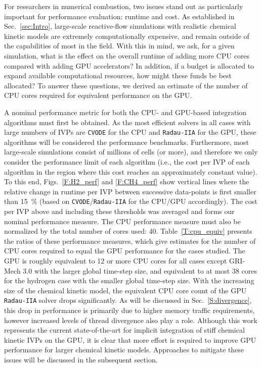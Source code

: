 \documentclass[preprint,review,11pt]{elsarticle}
\begin{document}
For researchers in numerical combustion, two issues stand out as particularly important for performance evaluation: runtime and cost.
As established in Sec.~\ref{sec:Intro}, large-scale reactive-flow simulations with realistic chemical kinetic models are extremely computationally expensive, and remain outside of the capabilities of most in the field.
With this in mind, we ask, for a given simulation, what is the effect on the overall runtime of adding more CPU cores compared with adding GPU accelerators?
In addition, if a budget is allocated to expand available computational resources, how might these funds be best allocated?
To answer these questions, we derived an estimate of the number of CPU cores required for equivalent performance on the GPU.

A nominal performance metric for both the CPU- and GPU-based integration algorithms must first be obtained.
As the most efficient solvers in all cases with large numbers of IVPs are \texttt{CVODE} for the CPU and \texttt{Radau-IIA} for the GPU, these algorithms will be considered the performance benchmarks.
Furthermore, most large-scale simulations consist of millions of cells (or more), and therefore we only consider the performance limit of each algorithm (i.e., the cost per IVP of each algorithm in the region where this cost reaches an approximately constant value).
To this end, Figs.~\ref{F:H2_perf} and \ref{F:CH4_perf} show vertical lines where the relative change in runtime per IVP between successive data-points is first smaller than \SI{15}{\percent} (based on \texttt{CVODE}\slash\texttt{Radau-IIA} for the CPU\slash GPU accordingly).
The cost per IVP above and including these thresholds was averaged and forms our nominal performance measure.
The CPU performance measure must also be normalized by the total number of cores used: \num{40}.
Table~\ref{T:cpu_equiv} presents the ratios of these performance measures, which give estimates for the number of CPU cores required to equal the GPU performance for the cases studied.
The GPU is roughly equivalent to \num{12} or more CPU cores for all cases except GRI-Mech 3.0 with the larger global time-step size, and equivalent to at most \num{38} cores for the hydrogen case with the smaller global time-step size.
With the increasing size of the chemical kinetic model, the equivalent CPU core count of the GPU \texttt{Radau-IIA} solver drops significantly.
As will be discussed in Sec.~\ref{S:divergence}, this drop in performance is primarily due to higher memory traffic requirements, however increased levels of thread divergence also play a role.
Although this work represents the current state-of-the-art for implicit integration of stiff chemical kinetic IVPs on the GPU, it is clear that more effort is required to improve GPU performance for larger chemical kinetic models.
Approaches to mitigate these issues will be discussed in the subsequent section.
\end{document}
